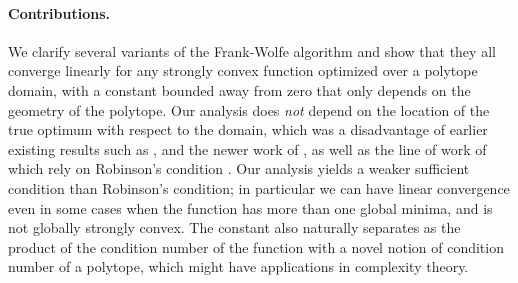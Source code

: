 \documentclass{article} %
\newcommand{\0}{\mathbf{0}} %
\begin{document}
\vspace{-2mm}
\paragraph{Contributions.}
We clarify several variants of the Frank-Wolfe algorithm and show that they all converge linearly for any strongly convex function optimized over a polytope domain, with a constant bounded away from zero that only depends on the geometry of the polytope. 
%
%
%
%
%
%
%
%
%
%
%
%
Our analysis does \emph{not} depend on the location of the true optimum with
respect to the domain, which was a disadvantage of earlier existing results
such as \citep{Wolfe:1970wy,Guelat:1986fq,Beck:2004jm}, and the newer work of \citep{Pena:2015ta},
as well as the line of work of 
\citep{Ahipasaoglu:2008il,Kumar:2010ku,Nanculef:2014bj} which rely on
Robinson's condition \citep{Robinson:1982ii}.
Our analysis yields a weaker
sufficient condition than Robinson's condition; in particular we can have
linear convergence even in some cases when the function has more than one
global minima, and is not globally strongly convex. The constant also naturally separates as the product of the condition number of the function with a novel notion of condition number of a polytope, which might have applications in complexity theory.
%
%

\vspace{-2mm}
\end{document}
